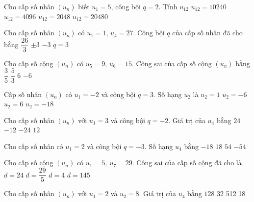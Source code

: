 \begin{ex}
Cho cấp số nhân $(u_n)$ biết $u_1=5$, công bội $q=2$. Tính $u_{12}$
\choice
{\True $u_{12}=10240$}
{$u_{12}=4096$}
{$u_{12}=2048$}
{$u_{12}=20480$}
\end{ex}
\begin{ex}
Cho cấp số nhân $(u_n)$ có $u_1=1$, $u_4=27$. Công bội $q$ của cấp số nhân đã cho bằng
\choice
{$\dfrac{26}{3}$}
{$\pm 3$}
{$-3$}
{\True $q=3$}
\end{ex}
\begin{ex}
    Cho cấp số cộng $(u_n)$ có $u_5=9$, $u_6=15$. Công sai của cấp số cộng $(u_n)$ bằng
\choice
{$\dfrac{3}{5}$}
{$\dfrac{5}{3}$}
{\True $6$}
{$-6$}
\end{ex}
\begin{ex}
Cấp số nhân $(u_n)$ có $u_1=-2$ và công bội $q=3$. Số hạng $u_2$ là
\choice
{$u_2=1$}
{\True $u_2=-6$}
{$u_2=6$}
{$u_2=-18$}
\end{ex}
\begin{ex}
Cho cấp số nhân $(u_n)$ với $u_1=3$ và công bội $q=-2$. Giá trị của $u_4$ bằng 
\choice
{$24$}
{$-12$}
{\True $-24$}
{$12$}
\end{ex}
\begin{ex}
Cho cấp số nhân có $u_1=2$ và công bội $q=-3$. Số hạng $u_4$ bằng
\choice
{$-18$}
{$18$}
{$54$}
{\True $-54$}
\end{ex}
\begin{ex}
Cho cấp số cộng $(u_n)$ có $u_1=5,\ u_7=29$. Công sai của cấp số cộng đã cho là
\choice
{$d=24$}
{$d=\dfrac{29}{5}$}
{\True $d=4$}
{$d=145$}
\end{ex}
\begin{ex}
Cho cấp số nhân $(u_n)$ với $u_1=2$ và $u_2=8$. Giá trị của $u_4$ bằng
\choice
{\True $128$}
{32}
{512}
{18}
\end{ex}
